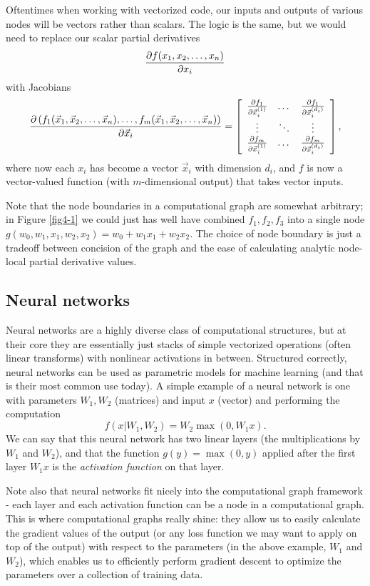 Oftentimes when working with vectorized code, our inputs and outputs of various nodes will be vectors rather than scalars. The logic is the same, but we would need to replace our scalar partial derivatives
$$\frac{\partial f(x_1, x_2, \dots, x_n)}{\partial x_i}$$
with Jacobians
$$\frac{\partial \left(f_1(\vec{x}_1, \vec{x}_2, \dots, \vec{x}_n), \dots, f_m(\vec{x}_1, \vec{x}_2, \dots, \vec{x}_n)\right)}{\partial \vec{x}_i} 
= \left[ 
\begin{array}{ccc}
    \frac{\partial f_1}{\partial \vec{x}_i^{(1)}} & \dots & \frac{\partial f_1}{\partial \vec{x}_i^{(d_i)}} \\
    \vdots & \ddots & \vdots \\
    \frac{\partial f_m}{\partial \vec{x}_i^{(1)}} & \dots & \frac{\partial f_m}{\partial \vec{x}_i^{(d_i)}} \\
\end{array}
\right],$$
where now each $x_i$ has become a vector $\vec{x}_i$ with dimension $d_i$, and $f$ is now a vector-valued function (with $m$-dimensional output) that takes vector inputs.

Note that the node boundaries in a computational graph are somewhat arbitrary; in Figure \ref{fig4-1} we could just has well have combined $f_1, f_2, f_3$ into a single node $g(w_0, w_1, x_1, w_2, x_2) = w_0 + w_1x_1 + w_2x_2$. The choice of node boundary is just a tradeoff between concision of the graph and the ease of calculating analytic node-local partial derivative values.

\subsection{Neural networks}
Neural networks are a highly diverse class of computational structures, but at their core they are essentially just stacks of simple vectorized operations (often linear transforms) with nonlinear activations in between. Structured correctly, neural networks can be used as parametric models for machine learning (and that is their most common use today). A simple example of a neural network is one with parameters $W_1, W_2$ (matrices) and input $x$ (vector) and performing the computation
$$f(x | W_1, W_2) = W_2\max\left(0, W_1x\right).$$
We can say that this neural network has two linear layers (the multiplications by $W_1$ and $W_2$), and that the function $g(y) = \max(0, y)$ applied after the first layer $W_1x$ is the \emph{activation function} on that layer. 

Note also that neural networks fit nicely into the computational graph framework - each layer and each activation function can be a node in a computational graph. This is where computational graphs really shine: they allow us to easily calculate the gradient values of the output (or any loss function we may want to apply on top of the output) with respect to the parameters (in the above example, $W_1$ and $W_2$), which enables us to efficiently perform gradient descent to optimize the parameters over a collection of training data.


